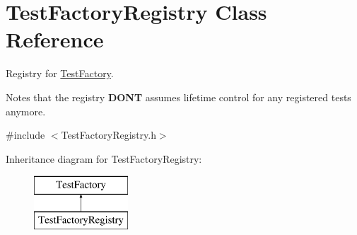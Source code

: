 \hypertarget{class_test_factory_registry}{}\section{Test\+Factory\+Registry Class Reference}
\label{class_test_factory_registry}


Registry for \hyperlink{class_test_factory}{Test\+Factory}.

Notes that the registry {\bfseries D\+ON\textquotesingle{}T} assumes lifetime control for any registered tests anymore.  




{\ttfamily \#include $<$Test\+Factory\+Registry.\+h$>$}

Inheritance diagram for Test\+Factory\+Registry\+:\begin{figure}[H]
\begin{center}
\leavevmode
\includegraphics[height=2.000000cm]{class_test_factory_registry}
\end{center}
\end{figure}
